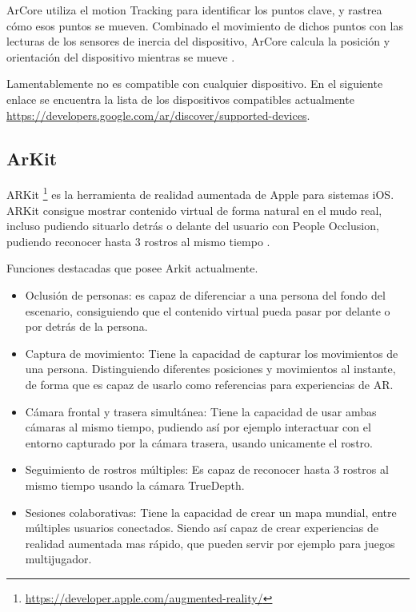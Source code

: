 ArCore utiliza el motion Tracking para identificar los puntos clave, y rastrea cómo esos puntos se mueven. Combinado el movimiento de dichos puntos con  las lecturas de los sensores de inercia del dispositivo, ArCore calcula la posición y orientación del dispositivo mientras se mueve \cite{google}.

Lamentablemente no es compatible con cualquier dispositivo. En el siguiente enlace se encuentra la lista de los dispositivos compatibles actualmente \url{https://developers.google.com/ar/discover/supported-devices}.

\subsection{ArKit}
ARKit \footnote{\url{https://developer.apple.com/augmented-reality/}} es la herramienta de realidad aumentada de Apple para sistemas iOS. ARKit consigue mostrar contenido virtual de forma natural en el mudo real, incluso pudiendo situarlo detrás o delante del usuario con People Occlusion, pudiendo reconocer hasta 3 rostros al mismo tiempo \cite{apple_inc}.

Funciones destacadas que posee Arkit actualmente.
\begin{itemize}
	\item Oclusión de personas: es capaz de diferenciar a una persona del fondo del escenario, consiguiendo que el contenido virtual  pueda pasar por delante o por detrás de la persona.
	\item Captura de movimiento: Tiene la capacidad de capturar los movimientos de una persona. Distinguiendo diferentes posiciones y movimientos al instante, de forma que es capaz de usarlo como referencias para experiencias de AR.
	\item Cámara frontal y trasera simultánea: Tiene la capacidad de usar ambas cámaras al mismo tiempo, pudiendo así por ejemplo interactuar con el entorno capturado por la cámara trasera, usando unicamente el rostro.
	\item Seguimiento de rostros múltiples: Es capaz de reconocer hasta 3 rostros al mismo tiempo usando la cámara TrueDepth.
	\item Sesiones colaborativas: Tiene la capacidad de crear un mapa mundial, entre múltiples usuarios conectados. Siendo así capaz de crear experiencias de realidad aumentada mas rápido, que pueden servir por ejemplo para juegos multijugador.
\end{itemize}



